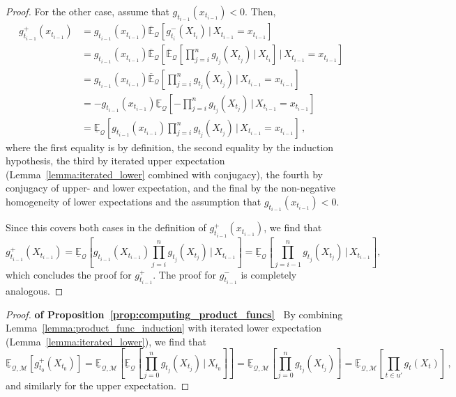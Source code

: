 \documentclass[twoside,11pt]{article}
\newcommand{\lexp}{\underline{\mathbb{E}}_{\rateset,\mathcal{M}}}
\newcommand{\rateset}{\mathcal{Q}}
\begin{document}
\begin{proof}
For the other case, assume that $g_{t_{i-1}}(x_{t_{i-1}})< 0$. Then,
\begin{align*}
g_{t_{i-1}}^+(x_{t_{i-1}}) &= g_{t_{i-1}}(x_{t_{i-1}})\overline{\mathbb{E}}_{\rateset}\left[g_{t_{i}}^-(X_{t_{i}})\,\vert\,X_{t_{i-1}}=x_{t_{i-1}}\right] \\
&= g_{t_{i-1}}(x_{t_{i-1}})\overline{\mathbb{E}}_{\rateset}\left[ \overline{\mathbb{E}}_{\rateset}\left[\prod_{j=i}^{n}g_{t_j}(X_{t_j})\,\Bigg\vert\,X_{t_i}\right]\,\Bigg\vert\,X_{t_{i-1}}=x_{t_{i-1}}\right] \\
&= g_{t_{i-1}}(x_{t_{i-1}})\overline{\mathbb{E}}_{\rateset}\left[\prod_{j=i}^{n}g_{t_j}(X_{t_j})\,\Bigg\vert\,X_{t_{i-1}}=x_{t_{i-1}}\right] \\
&= -g_{t_{i-1}}(x_{t_{i-1}})\underline{\mathbb{E}}_{\rateset}\left[-\prod_{j=i}^{n}g_{t_j}(X_{t_j})\,\Bigg\vert\,X_{t_{i-1}}=x_{t_{i-1}}\right] \\
&= \underline{\mathbb{E}}_{\rateset}\left[g_{t_{i-1}}(x_{t_{i-1}})\prod_{j=i}^{n}g_{t_j}(X_{t_j})\,\Bigg\vert\,X_{t_{i-1}}=x_{t_{i-1}}\right]\,,
\end{align*}
where the first equality is by definition, the second equality by the induction hypothesis, the third by iterated upper expectation (Lemma~\ref{lemma:iterated_lower} combined with conjugacy), the fourth by conjugacy of upper- and lower expectation, and the final by the non-negative homogeneity of lower expectations and the assumption that $g_{t_{i-1}}(x_{t_{i-1}})<0$.

Since this covers both cases in the definition of $g_{t_{i-1}}^+(x_{t_{i-1}})$, we find that
\begin{equation*}
g_{t_{i-1}}^+(X_{t_{i-1}}) = \underline{\mathbb{E}}_{\rateset}\left[g_{t_{i-1}}(X_{t_{i-1}})\prod_{j=i}^{n}g_{t_j}(X_{t_j})\,\Bigg\vert\,X_{t_{i-1}}\right] = \underline{\mathbb{E}}_{\rateset}\left[\prod_{j={i-1}}^{n}g_{t_j}(X_{t_j})\,\Bigg\vert\,X_{t_{i-1}}\right],
\end{equation*}
which concludes the proof for $g_{t_{i-1}}^+$. The proof for $g_{t_{i-1}}^-$ is completely analogous.
\end{proof}

\begin{proof}{\bf of Proposition~\ref{prop:computing_product_funcs}~}
By combining Lemma~\ref{lemma:product_func_induction} with iterated lower expectation (Lemma~\ref{lemma:iterated_lower}), we find that
\begin{equation*}
\lexp\left[g_{t_0}^+(X_{t_0})\right] = \lexp\left[\underline{\mathbb{E}}_{\rateset}\left[\prod_{j=0}^{n}g_{t_j}(X_{t_j})\,\Bigg\vert\,X_{t_0}\right]\right] = \lexp\left[\prod_{j=0}^{n}g_{t_j}(X_{t_j})\right] = \lexp\left[\prod_{t\in u'}g_{t}(X_{t})\right]\,,
\end{equation*}
and similarly for the upper expectation.
\end{proof}
\end{document}
